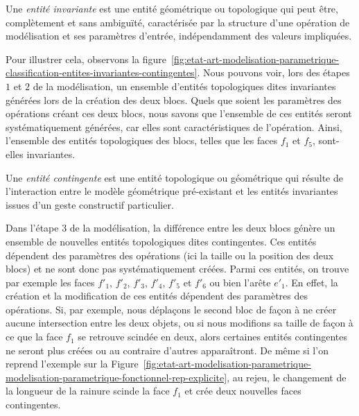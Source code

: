 \begin{definition}\label{def:entite-invariante}%
	Une \emph{entité invariante} est une entité géométrique ou topologique qui peut être,
	complètement et sans ambiguïté, caractérisée par la structure d'une opération
	de modélisation et ses paramètres d'entrée, indépendamment des valeurs
	impliquées. %
\end{definition}

Pour illustrer cela, observons la
figure~\ref{fig:etat-art-modelisation-parametrique-classification-entites-invariantes-contingentes}. Nous pouvons voir, lors des étapes $1$ et $2$ de la modélisation, un ensemble
d'entités topologiques dites invariantes générées lors de la création des deux blocs. %
Quels que soient les paramètres des opérations créant ces deux blocs, nous
savons que l'ensemble de ces entités seront systématiquement générées, car elles
sont caractéristiques de l'opération. %
Ainsi, l'ensemble des entités topologiques des blocs, telles que les faces
$f_{1}$ et $f_{5}$, sont-elles invariantes. %

\begin{definition}\label{def:entite-contingente}%
	Une \emph{entité contingente} est une entité topologique ou géométrique qui résulte
	de l'interaction entre le modèle géométrique pré-existant et les entités
	invariantes issues d'un geste constructif particulier. %
\end{definition}

Dans l'étape $3$ de la modélisation, la différence entre les deux blocs génère
un ensemble de nouvelles entités topologiques dites contingentes. %
Ces entités dépendent des paramètres des opérations (ici la taille ou la
position des deux blocs) et ne sont donc pas systématiquement créées. %
Parmi ces entités, on trouve par exemple les faces $f'_{1}$, $f'_{2}$, $f'_{3}$,
$f'_{4}$, $f'_{5}$ et $f'_{6}$
ou bien l'arête $e'_{1}$. %
En effet, la création et la modification de ces entités dépendent des paramètres
des opérations. %
Si, par exemple, nous déplaçons le second bloc de façon à ne créer aucune
intersection entre les deux objets, ou si nous modifions sa taille de façon à ce
que la face $f_{1}$ se retrouve scindée en deux, alors certaines entités
contingentes ne seront plus créées ou au contraire d'autres apparaîtront. %
De même si l'on reprend l'exemple sur la
Figure~\ref{fig:etat-art-modelisation-parametrique-modelisation-parametrique-fonctionnel-rep-explicite},
au rejeu, le changement de la longueur de la rainure scinde la face $f_{1}$ et
crée deux nouvelles faces contingentes. %

